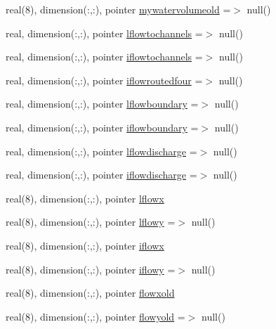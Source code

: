 \begin{DoxyCompactItemize}
\item 
real(8), dimension(\+:,\+:), pointer \mbox{\hyperlink{structmodulerunoff_1_1t__runoff_a0f2602d69a943284b7568871d262b508}{mywatervolumeold}} =$>$ null()
\item 
real, dimension(\+:,\+:), pointer \mbox{\hyperlink{structmodulerunoff_1_1t__runoff_a688ca181feec3248382318033f3afddb}{lflowtochannels}} =$>$ null()
\item 
real, dimension(\+:,\+:), pointer \mbox{\hyperlink{structmodulerunoff_1_1t__runoff_ae39d3792ed9dca885f9954e55f3a1a5f}{iflowtochannels}} =$>$ null()
\item 
real, dimension(\+:,\+:), pointer \mbox{\hyperlink{structmodulerunoff_1_1t__runoff_a4266f79dafd30177e2c2de7ced232f7b}{iflowroutedfour}} =$>$ null()
\item 
real, dimension(\+:,\+:), pointer \mbox{\hyperlink{structmodulerunoff_1_1t__runoff_a6a8a2a70f9884df1de8f4c882249fd66}{lflowboundary}} =$>$ null()
\item 
real, dimension(\+:,\+:), pointer \mbox{\hyperlink{structmodulerunoff_1_1t__runoff_ab27586fba2ecb4ddf7a23d75fc32813b}{iflowboundary}} =$>$ null()
\item 
real, dimension(\+:,\+:), pointer \mbox{\hyperlink{structmodulerunoff_1_1t__runoff_a650500cc83dac46b5abc545a8eef3ffd}{lflowdischarge}} =$>$ null()
\item 
real, dimension(\+:,\+:), pointer \mbox{\hyperlink{structmodulerunoff_1_1t__runoff_a4da8b1217207b53bf1c939573e7a8ac6}{iflowdischarge}} =$>$ null()
\item 
real(8), dimension(\+:,\+:), pointer \mbox{\hyperlink{structmodulerunoff_1_1t__runoff_a3ed75d867c355853e68f38e0aa258838}{lflowx}}
\item 
real(8), dimension(\+:,\+:), pointer \mbox{\hyperlink{structmodulerunoff_1_1t__runoff_aedfd657af85749aa0ca2b53477893541}{lflowy}} =$>$ null()
\item 
real(8), dimension(\+:,\+:), pointer \mbox{\hyperlink{structmodulerunoff_1_1t__runoff_a1bc5a9b39cb18c2617514e4d9dc75ddf}{iflowx}}
\item 
real(8), dimension(\+:,\+:), pointer \mbox{\hyperlink{structmodulerunoff_1_1t__runoff_afccc498a468309de7ca8b5af7a5a13cb}{iflowy}} =$>$ null()
\item 
real(8), dimension(\+:,\+:), pointer \mbox{\hyperlink{structmodulerunoff_1_1t__runoff_a1586f3a171ed55caf0518e245e8130de}{flowxold}}
\item 
real(8), dimension(\+:,\+:), pointer \mbox{\hyperlink{structmodulerunoff_1_1t__runoff_a336e58e7044c60cbbe7d1e5ca8681346}{flowyold}} =$>$ null()

\end{DoxyCompactItemize}
